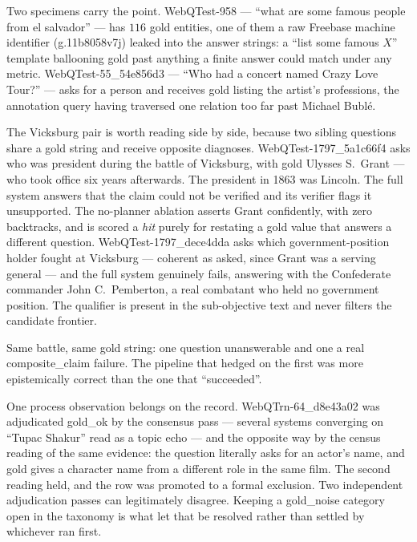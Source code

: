 Two specimens carry the point. \textsf{WebQTest-958} --- ``what are some famous
people from el salvador'' --- has $116$ gold entities, one of them a raw
Freebase machine identifier (\textsf{g.11b8058v7j}) leaked into the answer
strings: a ``list some famous $X$'' template ballooning gold past anything a
finite answer could match under any metric. \textsf{WebQTest-55\_54e856d3} ---
``Who had a concert named Crazy Love Tour?'' --- asks for a person and receives
gold listing the artist's professions, the annotation query having traversed one
relation too far past Michael Bublé.

The Vicksburg pair is worth reading side by side, because two sibling questions
share a gold string and receive opposite diagnoses.
\textsf{WebQTest-1797\_5a1c66f4} asks who was president during the battle of
Vicksburg, with gold \textsf{Ulysses S.~Grant} --- who took office six years
afterwards. The president in 1863 was Lincoln. The full system answers that the
claim could not be verified and its verifier flags it \textsf{unsupported}. The
no-planner ablation asserts Grant confidently, with zero backtracks, and is
scored a \emph{hit} purely for restating a gold value that answers a different
question. \textsf{WebQTest-1797\_dece4dda} asks which government-position holder
fought at Vicksburg --- coherent as asked, since Grant was a serving general ---
and the full system genuinely fails, answering with the Confederate commander
John C.~Pemberton, a real combatant who held no government position. The
qualifier is present in the sub-objective text and never filters the candidate
frontier.

Same battle, same gold string: one question unanswerable and one a real
\textsf{composite\_claim} failure. The pipeline that hedged on the first was
more epistemically correct than the one that ``succeeded''.

One process observation belongs on the record. \textsf{WebQTrn-64\_d8e43a02} was
adjudicated \textsf{gold\_ok} by the consensus pass --- several systems
converging on ``Tupac Shakur'' read as a topic echo --- and the opposite way by
the census reading of the same evidence: the question literally asks for an
actor's name, and gold gives a character name from a different role in the same
film. The second reading held, and the row was promoted to a formal exclusion.
Two independent adjudication passes can legitimately disagree. Keeping a
\textsf{gold\_noise} category open in the taxonomy is what let that be resolved
rather than settled by whichever ran first.

